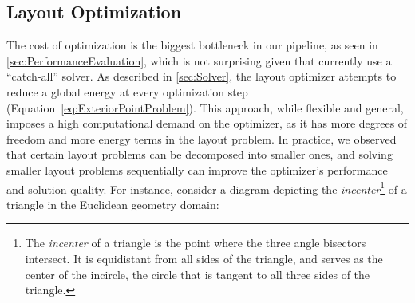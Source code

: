 
\subsection{Layout Optimization}

The cost of optimization is the biggest bottleneck in our pipeline, as seen in \cref{sec:PerformanceEvaluation}, which is not surprising given that \Penrose{} currently use a ``catch-all'' solver. As described in \cref{sec:Solver}, the layout optimizer attempts to reduce a global energy at every optimization step (Equation~\ref{eq:ExteriorPointProblem}). This approach, while flexible and general, imposes a high computational demand on the optimizer, as it has more degrees of freedom and more energy terms in the layout problem. In practice, we observed that certain layout problems can be decomposed into smaller ones, and solving smaller layout problems sequentially can improve the optimizer's performance and solution quality. For instance, consider a diagram depicting the \emph{incenter}\footnote{The \textit{incenter} of a triangle is the point where the three angle bisectors intersect. It is equidistant from all sides of the triangle, and serves as the center of the incircle, the circle that is tangent to all three sides of the triangle.} of a triangle in the Euclidean geometry domain:

